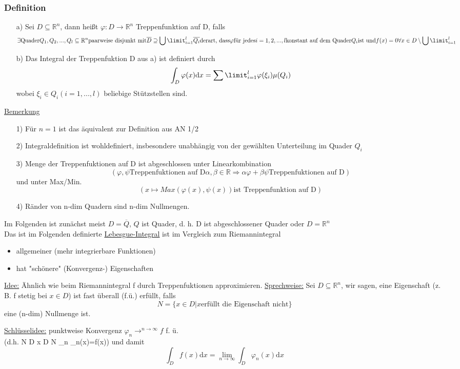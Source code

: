 \subsubsection{Definition}
\begin{itemize}
	\item[a)] Sei $D \subseteq \mathbb{R}^n$, dann heißt $\varphi :D \to \mathbb{R}^n$ Treppenfunktion auf D, falls
		\[ \exists \text{Quader} Q_1, Q_2, ..., Q_l \subseteq \mathbb{R}^n \text{paarweise disjunkt mit} \overline{D} \supseteq \bigcup\limit_{i=1}^l \overline{Q_i}
		\text{derart, dass} \varphi \text{für jedes} i = 1,2,...,l \text{konstant auf dem Quader} Q_i \text{ist und} f(x) = 0 \forall x \in D\setminus \bigcup\limit_{i=1}^l\]
	\item[b)] Das Integral der Treppenfuktion \varphi\colon D \to {} aus a) ist definiert durch
		\[ \int_D \varphi(x) \text{d}x = \sum\limit_{i=1}^l \varphi(\xi_i) \mu(Q_i)\]
		wobei $\xi_i \in Q_i (i=1,...,l)$ beliebige Stützstellen sind. 
\end{itemize}

\underline{Bemerkung}
\begin{itemize}
	\item[1)] Für $n=1$ ist das äquivalent zur Definition aus AN 1/2
	\item[2)] Integraldefinition ist wohldefiniert, insbesondere unabhängig von der gewählten Unterteilung im Quader $Q_i$
	\item[3)] Menge der Treppenfuktionen auf D ist abgeschlossen unter Linearkombination
	\[(\varphi, \psi \text{Treppenfuktionen auf D} \alpha, \beta \in \mathbb{R} \Rightarrow \alpha\varphi + \beta\psi \text{Treppenfuktionen auf D})\]
	und unter Max/Min.
	\[(x \mapsto Max (\varphi(x), \psi(x)) \text{ist Treppenfunktion auf D})\]
	\item[4)] Ränder von n-dim Quadern sind n-dim Nullmengen.
\end{itemize}
Im Folgenden ist zunächst meist $D=\overline{Q}$, $Q$ ist Quader, d. h. D ist abgeschlossener Quader oder $D=\mathbb{R}^n$\\
Das ist im Folgenden definierte \underline{Lebesgue-Integral} ist im Vergleich zum Riemannintegral
\begin{itemize}
	\item allgemeiner (mehr integrierbare Funktionen)
	\item hat "schönere" (Konvergenz-) Eigenschaften
\end{itemize}

\underline{Idee:} Ähnlich wie beim Riemannintegral f durch Treppenfuktionen approximieren.
\underline{Sprechweise:} Sei $D \subseteq \mathbb{R}^n$, wir sagen, eine Eigenschaft (z. B. f stetig bei $x \in D$) ist fast überall (f.ü.) erfüllt, falls
\[N=\{x \in D | x \text{erfüllt die Eigenschaft nicht}\}\]
eine (n-dim) Nullmenge ist.

\underline{Schlüsselidee:} punktweise Konvergenz $\varphi_n \longrightarrow^{n \to \infty} f$ f. ü.\\
	(d.h. \exists N \subseteq D  \forall x \in D \setminus N \colon \lim_{n \to \infty} \varphi_n(x)=f(x)) und damit
	\[\int_D f(x) \text{d}x = \lim_{n \to \infty} \int_D \varphi_n(x) \text{d}x\]